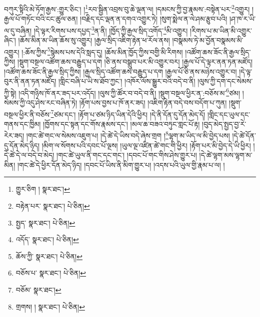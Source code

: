 བཀུར་སྟིའི་མེ་ཏོག་རྒྱས་:གྱུར་ཅིང་། །\footnote{གྱུར་ཅིག །  སྣར་ཐང་། }རབ་སྦྱིན་འབྲས་བུ་ཆེ་ལྡན་ལ། །དམངས་ཀྱི་བྱ་རྣམས་:བསྟེན་པར་\footnote{བརྟེན་པར་  སྣར་ཐང་།  པེ་ཅིན། }འགྱུར། །རྒྱལ་པོ་གཏོང་བའི་ངང་ཚུལ་ཅན། །བརྗིད་དང་ལྡན་ན་དགའ་འགྱུར་ཏེ། །སུག་སྨེལ་ན་ལེ་ཤམ་རྩུབ་པའི། །ཤ་ཁ་ར་ཡི་ལ་དུ་བཞིན། །དེ་ལྟར་རིགས་པས་དཔྱད་\footnote{སྤྱད་  སྣར་ཐང་།  པེ་ཅིན། }ན་ནི། །ཁྱོད་ཀྱི་རྒྱལ་སྲིད་འགོད་\footnote{འདོད་  སྣར་ཐང་།  པེ་ཅིན། }མི་འགྱུར། །རིགས་པ་མ་ཡིན་མི་འགྱུར་ཞིང་། །ཆོས་མིན་མ་ཡིན་ཆོས་སུ་འགྱུར། །རྒྱལ་སྲིད་འཇིག་རྟེན་ཕ་རོལ་ནས། །བསྣམས་ཏེ་མ་བྱོན་བསྣམས་མི་འགྱུར། །:ཆོས་ཀྱིས་\footnote{ཆོས་ཀྱི་  སྣར་ཐང་།  པེ་ཅིན། }སྙེམས་པས་དེའི་སླད་དུ། །ཆོས་མིན་ཁྱོད་ཀྱིས་བགྱི་མི་རིགས། །འཚོག་ཆས་ཟོང་ནི་རྒྱལ་སྲིད་ཀྱིས། །སྡུག་བསྔལ་འཚོག་ཆས་བརྒྱུད་པ་དག །ཅི་ནས་བསྒྲུབ་པར་མི་འགྱུར་བར། །རྒྱལ་པོ་དེ་ལྟར་ནན་ཏན་མཛོད། །འཚོག་ཆས་ཟོང་ནི་རྒྱལ་སྲིད་ཀྱིས། །རྒྱལ་སྲིད་འཚོག་ཆས་བརྒྱུད་པ་དག །རྒྱལ་པོ་ཅི་ནས་མཉེས་འགྱུར་བ། །དེ་ལྟ་བུར་ནི་ནན་ཏན་མཛོད། །གླིང་བཞི་པ་ཡི་ས་ཐོབ་ཀྱང་། །འཁོར་ལོས་སྒྱུར་བའི་བདེ་བ་ནི། །ལུས་ཀྱི་དག་དང་སེམས་ཀྱི་སྟེ། །འདི་གཉིས་ཁོ་ནར་ཟད་པར་འདོད། །ལུས་ཀྱི་ཚོར་བ་བདེ་བ་ནི། །སྡུག་བསྔལ་ཕྱིར་ན་:བཅོས་མ་\footnote{བཅོས་པ་  སྣར་ཐང་།  པེ་ཅིན། }ཙམ། །སེམས་ཀྱི་འདུ་ཤེས་རང་བཞིན་ཏེ། །རྟོག་པས་བྱས་པ་ཁོ་ནར་ཟད། །འཇིག་རྟེན་བདེ་བས་བདོག་པ་ཀུན། །སྡུག་བསྔལ་ཕྱིར་ནི་བཅོས་\footnote{བཅོམ་  སྣར་ཐང་། }ཙམ་དང་། །རྟོག་པ་ཙམ་ཉིད་ཡིན་དེའི་ཕྱིར། །དེ་ནི་དོན་དུ་དོན་མེད་དོ། །གླིང་དང་ཡུལ་དང་གནས་དང་ཁྱིམ། །ཁྱོགས་དང་སྟན་དང་གོས་རྣམས་དང་། །མལ་ཆ་བཟའ་བཏུང་གླང་པོ་རྟ། །བུད་མེད་སྤྱད་བྱ་རེ་རེར་ཟད། །གང་ཚེ་གང་ལ་སེམས་འཇུག་པ། །དེ་ཚེ་དེ་ཡིས་བདེ་ཞེས་གྲག །\footnote{གྲགས། །  སྣར་ཐང་།  པེ་ཅིན། }ལྷག་མ་ཡིད་ལ་མི་བྱེད་པས། །དེ་ཚེ་དོན་དུ་དོན་མེད་ཉིད། །མིག་ལ་སོགས་པའི་དབང་པོ་ལྔས། །ཡུལ་ལྔ་འཛིན་ཚེ་གང་གི་ཕྱིར། །རྟོག་པར་མི་བྱེད་དེ་ཡི་ཕྱིར། །དེ་ཚེ་དེ་ལ་བདེ་བ་མེད། །གང་ཚེ་ཡུལ་ནི་གང་དང་གང་། །དབང་པོ་གང་གིས་ཤེས་གྱུར་པ། །དེ་ཚེ་ལྷག་མས་ལྷག་མ་མིན། །གང་ཚེ་དེ་ཕྱིར་དོན་མེད་ཉིད། །དབང་པོ་ཡིས་ནི་མིག་གྱུར་པ། །འདས་པའི་ཡུལ་གྱི་རྣམ་པ་ལ། །
